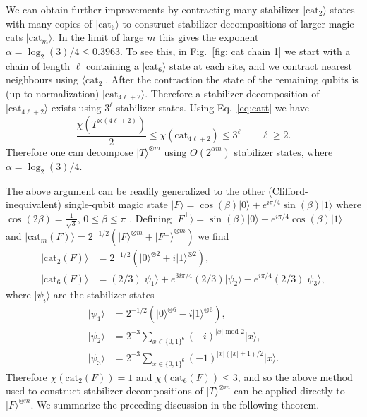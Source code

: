 \documentclass[a4paper,onecolumn,11pt,accepted=2021-11-11]{quantumarticle}
\newcommand{\cat}{\text{cat}}
\newcommand{\ket}[1]{\ensuremath{\lvert #1 \rangle}}
\newcommand{\bra}[1]{\ensuremath{\langle #1 \rvert}}
\begin{document}
We can obtain further improvements by contracting many stabilizer $\ket{\cat_2}$ states with many copies of $\ket{\cat_6}$ to construct stabilizer decompositions of larger magic cats $|\text{cat}_m\rangle$. In the limit of large $m$ this gives the exponent $\alpha = \log_2(3)/4 \leq 0.3963$. To see this, in Fig.~\ref{fig: cat chain 1} we start with a chain of length $\ell$ containing a $\ket{\cat_6}$ state at each site, and we contract nearest neighbours using $\bra{\cat_2}$. After the contraction the state of the remaining qubits  is (up to normalization) $\ket{\cat_{4\ell + 2}}$.
Therefore a stabilizer decomposition of $\ket{\cat_{4\ell + 2}}$ exists using $3^\ell$ stabilizer states. Using Eq.~\eqref{eq:catt} we have
\[
\frac{\chi(T^{\otimes (4\ell+2)})}{2}\leq \chi(\cat_{4\ell+2})\leq 3^{\ell} \qquad \ell\geq 2.
\]
Therefore one can decompose $\ket{T}^{\otimes m}$ using $O(2^{\alpha m})$ stabilizer states, where $\alpha = \log_2(3)/4$. 

The above argument can be readily generalized to the other (Clifford-inequivalent) single-qubit magic state $\ket{F} = \cos(\beta)\ket{0} + e^{i \pi/4} \sin(\beta) \ket{1}$ where $\cos(2\beta) = \frac{1}{\sqrt{3}}$, $0 \leq \beta \leq \pi$ \cite{bravyi2005universal}. Defining $\ket{F^\perp} = \sin(\beta)\ket{0} - e^{i \pi/4} \cos(\beta) \ket{1}$ and $\ket{\cat_m(F)} = 2^{-1/2}(\ket{F}^{\otimes m} + \ket{F^\perp}^{\otimes m})$ we find
\begin{align}\label{F cat decomps}
\ket{\cat_2(F)}&= 2^{-1/2}(\ket{0}^{\otimes 2}+ i \ket{1}^{\otimes 2}),\nonumber\\
\ket{\cat_6(F)} &= (2/3) \ket{\psi_1}
+ e^{3i\pi/4}(2/3) \ket{\psi_2} - e^{i\pi/4}(2/3) \ket{\psi_3},
\end{align} 
where $\ket{\psi_i}$ are the stabilizer states
\begin{align}
\ket{\psi_1} &= 2^{-1/2}(\ket{0}^{\otimes 6} - i \ket{1}^{\otimes 6}),\nonumber\\
\ket{\psi_2} &= 2^{-3} \sum_{x \in \{0,1 \}^6} (-i)^{|x| \text{ mod }2} \ket{x},\nonumber\\
\ket{\psi_3} &= 2^{-3} \sum_{x \in \{0,1 \}^6} (-1)^{|x|(|x|+1)/2} \ket{x}.
\end{align}
Therefore $\chi(\cat_2(F)) = 1$ and $\chi(\cat_6(F)) \leq 3$, and so the above method used to construct stabilizer decompositions of $\ket{T}^{\otimes m}$ can be applied directly to $\ket{F}^{\otimes m}$. We summarize the preceding discussion in the following theorem.
 
\end{document}

